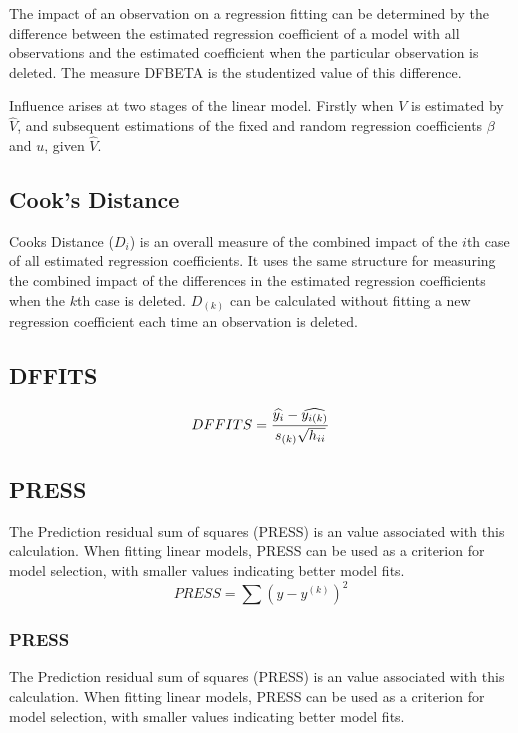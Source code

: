 \documentclass[12pt, a4paper]{report}
\theoremstyle{plain}
\theoremstyle{definition}
\theoremstyle{remark}
\begin{document}
The impact of an observation on a regression fitting can be determined by the difference between the estimated regression coefficient of a model with all observations and the estimated coefficient when the particular observation is deleted. The measure DFBETA is the studentized value of this difference.

Influence arises at two stages of the linear model. Firstly when $V$ is estimated by $\hat{V}$, and subsequent
estimations of the fixed and random regression coefficients $\beta$ and $u$, given $\hat{V}$.

\subsection{Cook's Distance}%
Cooks Distance ($D_{i}$) is an overall measure of the combined impact of the $i$th case of all estimated regression coefficients. It uses the same structure for measuring the combined impact of the differences in the estimated regression coefficients when the $k$th case is deleted. $D_{(k)}$ can be calculated without fitting
a new regression coefficient each time an observation is deleted.

\subsection{DFFITS} %
\begin{displaymath} DFFITS = {\widehat{y_i} -
\widehat{y_{i(k)}} \over s_{(k)} \sqrt{h_{ii}}} \end{displaymath}



\subsection{PRESS} %
The Prediction residual sum of squares (PRESS) is an value associated with this calculation. When fitting linear models, PRESS can be used as a criterion for model selection, with smaller values indicating better model fits.
\begin{equation}
PRESS = \sum(y-y^{(k)})^2
\end{equation}

\subsubsection{PRESS}

The Prediction residual sum of squares (PRESS) is an value associated with this calculation. When fitting linear models, PRESS can be used as a criterion for model selection, with smaller values indicating better model fits.
\end{document}
